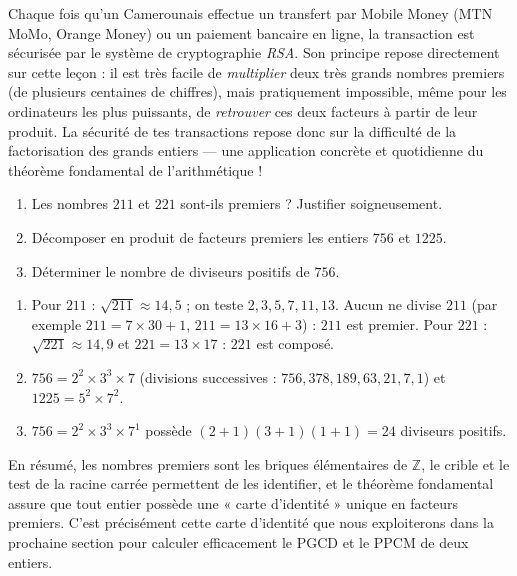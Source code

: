 \documentclass[11pt]{article}
\begin{document}
\begin{savaistu}
Chaque fois qu'un Camerounais effectue un transfert par Mobile Money (MTN MoMo, Orange Money) ou un paiement bancaire en ligne, la transaction est sécurisée par le système de cryptographie \emph{RSA}. Son principe repose directement sur cette leçon : il est très facile de \emph{multiplier} deux très grands nombres premiers (de plusieurs centaines de chiffres), mais pratiquement impossible, même pour les ordinateurs les plus puissants, de \emph{retrouver} ces deux facteurs à partir de leur produit. La sécurité de tes transactions repose donc sur la difficulté de la factorisation des grands entiers — une application concrète et quotidienne du théorème fondamental de l'arithmétique !
\end{savaistu}

\begin{exercice}
\begin{enumerate}
\item Les nombres $211$ et $221$ sont-ils premiers ? Justifier soigneusement.
\item Décomposer en produit de facteurs premiers les entiers $756$ et $\num{1225}$.
\item Déterminer le nombre de diviseurs positifs de $756$.
\end{enumerate}
\end{exercice}

\begin{corrige}[Exercice]
\begin{enumerate}
\item Pour $211$ : $\sqrt{211} \approx 14,5$ ; on teste $2, 3, 5, 7, 11, 13$. Aucun ne divise $211$ (par exemple $211 = 7 \times 30 + 1$, $211 = 13 \times 16 + 3$) : $211$ est premier. Pour $221$ : $\sqrt{221} \approx 14,9$ et $221 = 13 \times 17$ : $221$ est composé.
\item $756 = 2^2 \times 3^3 \times 7$ (divisions successives : $756, 378, 189, 63, 21, 7, 1$) et $\num{1225} = 5^2 \times 7^2$.
\item $756 = 2^2 \times 3^3 \times 7^1$ possède $(2+1)(3+1)(1+1) = 24$ diviseurs positifs.
\end{enumerate}
\end{corrige}

En résumé, les nombres premiers sont les briques élémentaires de $\mathbb{Z}$, le crible et le test de la racine carrée permettent de les identifier, et le théorème fondamental assure que tout entier possède une « carte d'identité » unique en facteurs premiers. C'est précisément cette carte d'identité que nous exploiterons dans la prochaine section pour calculer efficacement le PGCD et le PPCM de deux entiers.
\end{document}
